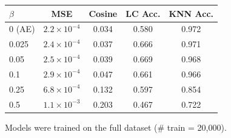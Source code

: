 \begin{table}[h]
    \centering
     \begin{tabular}{l | c c c c}
        {\bf $\beta$} & {\bf MSE} & {\bf Cosine} & {\bf LC Acc.} & {\bf KNN Acc.}\\
        \hline
        0 (AE) & $2.2 \times 10^{-4}$ & 0.034 & 0.580 & 0.972 \\
        0.025  & $2.4 \times 10^{-4}$ & 0.037 & 0.666 & 0.971 \\
        0.05   & $2.5 \times 10^{-4}$ & 0.039 & 0.669 & 0.968 \\
        0.1    & $2.9 \times 10^{-4}$ & 0.047 & 0.661 & 0.966 \\
        0.25   & $6.8 \times 10^{-4}$ & 0.132 & 0.597 & 0.854 \\
        0.5    & $1.1 \times 10^{-3}$ & 0.203 & 0.467 & 0.722 \\
    \end{tabular}
    {Models were trained on the full dataset (\# train = 20,000).}
    \label{table:toy_aas_kld_ablation_z_eq_2}
\end{table}



